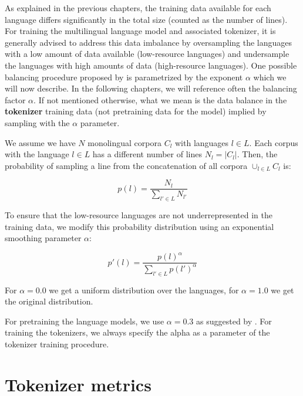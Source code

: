 
As explained in the previous chapters, the training data available for each language differs significantly in the total size (counted as the number of lines). For training the multilingual language model and associated tokenizer, it is generally advised to address this data imbalance by oversampling the languages with a low amount of data available (low-resource languages) and undersample the languages with high amounts of data (high-resource languages). One possible balancing procedure proposed by \citet{devlin_bert_2019,conneau_unsupervised_2020} is parametrized by the exponent $\alpha$ which we will now describe. In the following chapters, we will reference often the balancing factor $\alpha$. If not mentioned otherwise, what we mean is the data balance in the \textbf{tokenizer} training data (not pretraining data for the model) implied by sampling with the $\alpha$ parameter.

We assume we have $N$ monolingual corpora $C_l$ with languages $l \in L$. Each corpus with the language $l \in L$ has a different number of lines $N_l = |C_l|$. Then, the probability of sampling a line from the concatenation of all corpora $\cup_{l \in L} C_l$ is:

\begin{equation}
    p(l) = \frac{N_l}{\sum_{l' \in L} N_{l'}}
\end{equation}


To ensure that the low-resource languages are not underrepresented in the training data, we modify this probability distribution using an exponential smoothing parameter $\alpha$:

\begin{equation}
    p'(l) = \frac{p(l)^\alpha}{\sum_{l' \in L} p(l')^\alpha}
\end{equation}

For $\alpha = 0.0$ we get a uniform distribution over the languages, for $\alpha = 1.0$ we get the original distribution. 

For pretraining the language models, we use $\alpha = 0.3$ as suggested by \citet{conneau_unsupervised_2020-1}. For training the tokenizers, we always specify the alpha as a parameter of the tokenizer training procedure. 

\section{Tokenizer metrics}

